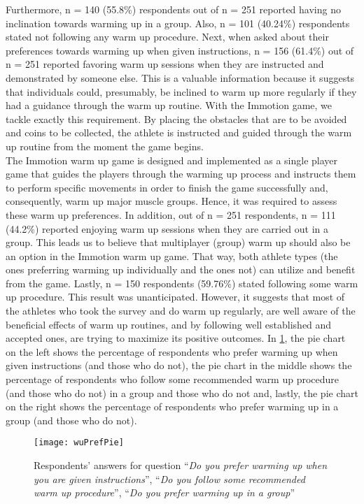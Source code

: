 Furthermore, n = 140 (55.8\%) respondents out of n = 251 reported having no inclination towards warming up in a group. Also, n = 101 (40.24\%) respondents stated not following any warm up procedure. Next, when asked about their preferences towards warming up when given instructions, n = 156 (61.4\%) out of n = 251 reported favoring warm up sessions when they are instructed and demonstrated by someone else. This is a valuable information because it suggests that individuals could, presumably, be inclined to warm up more regularly if they had a guidance through the warm up routine. With the Immotion game, we tackle exactly this requirement. By placing the obstacles that are to be avoided and coins to be collected, the athlete is instructed and guided through the warm up routine from the moment the game begins.\\The Immotion warm up game is designed and implemented as a single player game that guides the players through the warming up process and instructs them to perform specific movements in order to finish the game successfully and, consequently, warm up major muscle groups. Hence, it was required to assess these warm up preferences. In addition, out of n = 251 respondents, n = 111 (44.2\%) reported enjoying warm up sessions when they are carried out in a group. This leads us to believe that multiplayer (group) warm up should also be an option in the Immotion warm up game. That way, both athlete types (the ones preferring warming up individually and the ones not) can utilize and benefit from the game. Lastly, n = 150 respondents (59.76\%) stated following some warm up procedure. This result was unanticipated. However, it suggests that most of the athletes who took the survey and do warm up regularly, are well aware of the beneficial effects of warm up routines, and by following well established and accepted ones, are trying to maximize its positive outcomes. In \ref{fig:wuPrefPie}, the pie chart on the left shows the percentage of respondents who prefer warming up when given instructions (and those who do not), the pie chart in the middle shows the percentage of respondents who follow some recommended warm up procedure (and those who do not) in a group and those who do not and, lastly, the pie chart on the right shows the percentage of respondents who prefer warming up in a group (and those who do not).
\begin{figure}[h]
    \centering
    \texttt{[image: wuPrefPie]}
    \caption{Respondents' answers for question ``\textit{Do you prefer warming up when you are given instructions}'', ``\textit{Do you follow some recommended warm up procedure}'', ``\textit{Do you prefer warming up in a group}''}
    \label{fig:wuPrefPie}
\end{figure}\\
